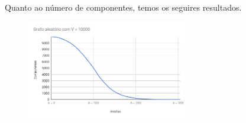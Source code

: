 \documentclass[12pt,letterpaper]{article}
\begin{document}
Quanto ao número de componentes, temos os seguires resultados.

\begin{figure}[H]
\end{figure}

\begin{figure}[H]
\end{figure}

\begin{figure}[H]
\includegraphics[width=7cm]{comp-10000.png}
\centering
\end{figure}
\end{document}
